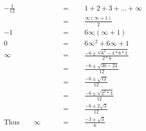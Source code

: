 \begin{align*}
-\frac{1}{12}\qquad&\,=\qquad1+2+3+...+\infty\\
\,&\,=\qquad\frac{\infty(\infty+1)}{2}\\
-1\qquad&\,=\qquad6\infty(\infty+1)\\
0\qquad&\,=\qquad6\infty^2+6\infty+1\\
\infty\qquad&\,=\qquad\frac{-6\pm\sqrt{6^2-4*6*1}}{2*6}\\
\,&\,=\qquad\frac{-6\pm\sqrt{36-24}}{12}\\
\,&\,=\qquad\frac{-6\pm\sqrt{12}}{12}\\
\,&\,=\qquad\frac{-6\pm\sqrt{2^2*3}}{12}\\
\,&\,=\qquad\frac{-6\pm2\sqrt{3}}{12}\\
\mathrm{Thus}\qquad\infty\qquad&\,=\qquad\frac{-3\pm\sqrt{3}}{6}
\end{align*}
